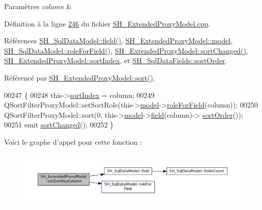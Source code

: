 \begin{DoxyParams}{Paramètres}
{\em column} & \\
\hline
\end{DoxyParams}


Définition à la ligne \hyperlink{SH__ExtendedProxyModel_8cpp_source_l00246}{246} du fichier \hyperlink{SH__ExtendedProxyModel_8cpp_source}{S\-H\-\_\-\-Extended\-Proxy\-Model.\-cpp}.



Références \hyperlink{classSH__SqlDataModel_a92c51d5c1f6aca08a7ee566ece1e4cb6}{S\-H\-\_\-\-Sql\-Data\-Model\-::field()}, \hyperlink{classSH__ExtendedProxyModel_a8c8b8930c6b1abd9bbb1dce1fdc9690b}{S\-H\-\_\-\-Extended\-Proxy\-Model\-::model}, \hyperlink{classSH__SqlDataModel_aa487bb763eaf2544e4eb5822cd666105}{S\-H\-\_\-\-Sql\-Data\-Model\-::role\-For\-Field()}, \hyperlink{classSH__ExtendedProxyModel_ad34f69425d6c86a2671cf9f85562a724}{S\-H\-\_\-\-Extended\-Proxy\-Model\-::sort\-Changed()}, \hyperlink{classSH__ExtendedProxyModel_a83cabe4cf90a26d26c4aaa40e944b2bd}{S\-H\-\_\-\-Extended\-Proxy\-Model\-::sort\-Index}, et \hyperlink{classSH__SqlDataFields_a67b20d296535d6b9dda6c85f75427ad1}{S\-H\-\_\-\-Sql\-Data\-Fields\-::sort\-Order}.



Référencé par \hyperlink{classSH__ExtendedProxyModel_a2d5fdb58bf67879e3f3130619b93104a}{S\-H\-\_\-\-Extended\-Proxy\-Model\-::sort()}.


\begin{DoxyCode}
00247 \{
00248     this->\hyperlink{classSH__ExtendedProxyModel_a83cabe4cf90a26d26c4aaa40e944b2bd}{sortIndex} = column;
00249     QSortFilterProxyModel::setSortRole(this->\hyperlink{classSH__ExtendedProxyModel_a8c8b8930c6b1abd9bbb1dce1fdc9690b}{model}->\hyperlink{classSH__SqlDataModel_aa487bb763eaf2544e4eb5822cd666105}{roleForField}(column));
00250     QSortFilterProxyModel::sort(0, this->\hyperlink{classSH__ExtendedProxyModel_a8c8b8930c6b1abd9bbb1dce1fdc9690b}{model}->\hyperlink{classSH__SqlDataModel_a92c51d5c1f6aca08a7ee566ece1e4cb6}{field}(column)->
      \hyperlink{classSH__SqlDataFields_a67b20d296535d6b9dda6c85f75427ad1}{sortOrder}());
00251     emit \hyperlink{classSH__ExtendedProxyModel_ad34f69425d6c86a2671cf9f85562a724}{sortChanged}();
00252 \}
\end{DoxyCode}


Voici le graphe d'appel pour cette fonction \-:\nopagebreak
\begin{figure}[H]
\begin{center}
\leavevmode
\includegraphics[width=350pt]{classSH__ExtendedProxyModel_ab8123244a5060aa35f5bce651046b99d_cgraph}
\end{center}
\end{figure}




